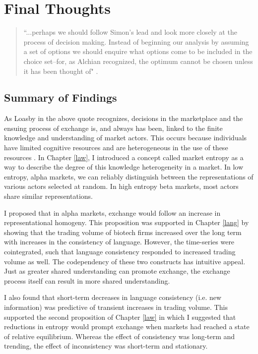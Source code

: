 \chapter{Final Thoughts \label{final}}


\begin{small}
\begin{quote}
``...perhaps we should follow Simon's lead and look more closely at the process of decision making. Instead of beginning our analysis by assuming a set of options we should enquire what options come to be included in the choice set--for, as Alchian recognized, the optimum cannot be chosen unless it has been thought of" \citep[p. 31]{loasby1999}. 
\end{quote}
\end{small}

\section{Summary of Findings}

As Loasby in the above quote recognizes, decisions in the marketplace and the ensuing process of exchange is, and always has been, linked to the finite knowledge and understanding of market actors. This occurs because individuals have limited cognitive resources and are heterogeneous in the use of these resources \citep{simon1957}. In Chapter \ref{law}, I introduced a concept called market entropy as a way to describe the degree of this knowledge heterogeneity in a market. In low entropy, alpha markets, we can reliably distinguish between the representations of various actors selected at random. In high entropy beta markets, most actors share similar representations.

I proposed that in alpha markets, exchange would follow an increase in representational homogeny. This proposition was supported in Chapter \ref{lang} by showing that the trading volume of biotech firms increased over the long term with increases in the consistency of language. However, the time-series were cointegrated, such that language consistency responded to increased trading volume as well. The codependency of these two constructs has intuitive appeal.  Just as greater shared understanding can promote exchange, the exchange process itself can result in more shared understanding.

I also found that short-term decreases in language consistency (i.e. new information) was predictive of transient increases in trading volume. This supported the second proposition of Chapter \ref{law} in which I suggested that reductions in entropy would prompt exchange when markets had reached a state of relative equilibrium. Whereas the effect of consistency was long-term and trending, the effect of inconsistency was short-term and stationary.

